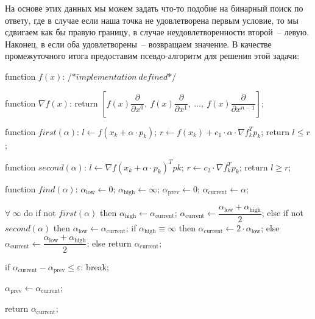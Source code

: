 \documentclass[12pt, a4paper, oneside, final]{article}
\begin{document}
	На основе этих данных мы можем задать что-то подобие на бинарный поиск по ответу, где в случае если наша точка не удовлетворена первым условие, то мы сдвигаем как бы правую границу, в случае неудовлетворенности второй~-- левую. Наконец, в если оба удовлетворены~-- возвращаем значение. В качестве промежуточного итога предоставим псевдо-алгоритм для решения этой задачи:
	\begin{pseudocode}
function $f(x)$:
	/*$implementation~defined$*/

function $\nabla{f(x)}$:
	return $\left[f(x)\dfrac{\partial}{\partial{x^{0}}}, ~ f(x)\dfrac{\partial}{\partial{x^{1}}}, ~ \ldots, ~ f(x)\dfrac{\partial}{\partial{x^{n - 1}}}\right]$;

function $first(\alpha)$:
	$l \gets f(x_{k} + \alpha \cdot p_{k})$;
	$r \gets f(x_{k}) + c_{1} \cdot \alpha \cdot \nabla{f^{T}_{k}p_{k}}$;
	return $l \leqslant r$;

function $second(\alpha)$:
	$l \gets \nabla{f(x_{k} + \alpha \cdot p_{k})^{T}p{k}}$;
	$r \gets c_{2} \cdot \nabla{f^{T}_{k}p_{k}}$;
	return $l \geqslant r$;

function $find(\alpha)$:
	$\alpha_{\text{low}} \gets 0$;
	$\alpha_{\text{high}} \gets \infty$;
	$\alpha_{\text{prev}} \gets 0$;
	$\alpha_{\text{current}} \gets \alpha$;

	$\forall~\infty$ do
		if not $first(\alpha)$ then
			$\alpha_{\text{high}} \gets \alpha_{\text{current}}$;
			$\alpha_{\text{current}} \gets \dfrac{\alpha_{\text{low}} + \alpha_{\text{high}}}{2}$;
		else if not $second(\alpha)$ then
			$\alpha_{\text{low}} \gets \alpha_{\text{current}}$;
			if $\alpha_{\text{high}} \equiv \infty$ then
				$\alpha_{\text{current}} \gets 2 \cdot \alpha_{\text{low}}$;
			else
				$\alpha_{\text{current}} \gets \dfrac{\alpha_{\text{low}} + \alpha_{\text{high}}}{2}$;
		else
			return $\alpha_{\text{current}}$;

		if $\alpha_{\text{current}} - \alpha_{\text{prev}} \leqslant \varepsilon$:
			break;

		$\alpha_{\text{prev}} \gets \alpha_{\text{current}}$;

	return $\alpha_{\text{current}}$;
	\end{pseudocode}
\end{document}
